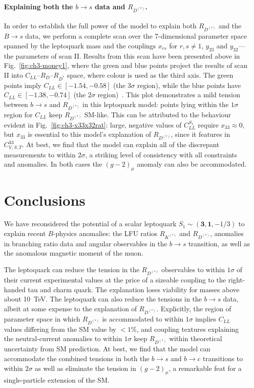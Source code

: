 \paragraph{Explaining both the $b \to s$ data and $R_{D^{(*)}}$.} In order to
establish the full power of the model to explain both $R_{D^{(*)}}$ and the
$B \to s$ data, we perform a complete scan over the 7-dimensional parameter
space spanned by the leptoquark mass and the couplings $x_{rs}$ for
$r,s \neq 1$, $y_{23}$ and $y_{32}$---the parameters of scan II. Results from
this scan have been presented above in Fig.~\ref{fig:ch3-money1}, where the
green and blue points project the results of scan II into
$C_{LL}$--$R_D$--$R_{D^*}$ space, where colour is used as the third axis. The
green points imply $C_{LL} \in [-1.54, -0.58]$ (the $3\sigma$ region), while the
blue points have $C_{LL} \in [-1.38, -0.74]$ (the $2\sigma$
region)~\cite{Aebischer:2019mlg}. This plot demonstrates a mild tension between
$b \to s$ and $R_{D^{(*)}}$ in this leptoquark model: points lying within the
$1\sigma$ region for $C_{LL}$ keep $R_{D^{(*)}}$ SM-like. This can be attributed
to the behaviour evident in Fig.~\ref{fig:ch3-x33x32rat}: large, negative values
of $C_{LL}^{S_{1}}$ require $x_{33} \approx 0$, but $x_{33}$ is essential to
this model's explanation of $R_{D^{(*)}}$, since it features in
$C^{33}_{V,S,T}$. At best, we find that the model can explain all of the
discrepant measurements to within $2\sigma$, a striking level of consistency
with all constraints and anomalies. In both cases the $(g-2)_\mu$ anomaly can
also be accommodated.

\section{Conclusions}

We have reconsidered the potential of a scalar leptoquark
$S_{1} \sim (\mathbf{3},\mathbf{1},-1/3)$ to explain recent $B$-physics
anomalies: the LFU ratios $R_{K^{(*)}}$ and $R_{D^{(*)}}$, anomalies in
branching ratio data and angular observables in the $b \to s$ transition, as
well as the anomalous magnetic moment of the muon.

The leptoquark can reduce the tension in the $R_{D^{(*)}}$ observables to within
$1\sigma$ of their current experimental values at the price of a sizeable
coupling to the right-handed tau and charm quark. The explanation loses
viability for masses above about \SI{10}{\TeV}. The leptoquark can also reduce
the tensions in the $b \to s$ data, albeit at some expense to the explanation of
$R_{D^{(*)}}$. Explicitly, the region of parameter space in which $R_{D^{(*)}}$
is accommodated to within $1\sigma$ implies $C_{LL}$ values differing from the
SM value by $< 1\%$, and coupling textures explaining the neutral-current
anomalies to within $1\sigma$ keep $R_{D^{(*)}}$ within theoretical uncertainty
from SM prediction. At best, we find that the model can accommodate the combined
tensions in both the $b \to s$ and $b \to c$ transitions to within $2\sigma$ as
well as eliminate the tension in $(g-2)_\mu$, a remarkable feat for a
single-particle extension of the SM.

